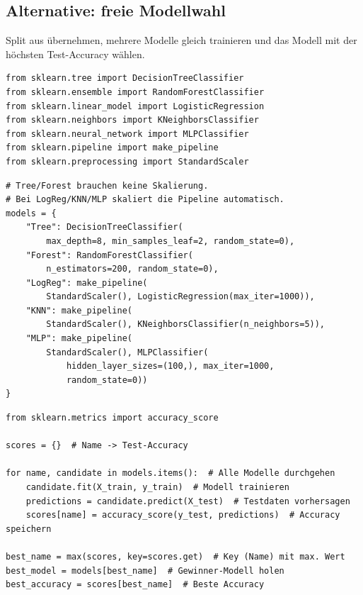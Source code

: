 \subsection{Alternative: freie Modellwahl}\label{sec:09-modellvergleich}
 Split aus  übernehmen, mehrere Modelle gleich trainieren und das Modell mit der höchsten Test-Accuracy wählen.

\begin{codebox}
\begin{lstlisting}[style=CodeExpert]
from sklearn.tree import DecisionTreeClassifier
from sklearn.ensemble import RandomForestClassifier
from sklearn.linear_model import LogisticRegression
from sklearn.neighbors import KNeighborsClassifier
from sklearn.neural_network import MLPClassifier
from sklearn.pipeline import make_pipeline
from sklearn.preprocessing import StandardScaler
\end{lstlisting}
\end{codebox}

\begin{codebox}
\begin{lstlisting}[style=CodeExpert]
# Tree/Forest brauchen keine Skalierung.
# Bei LogReg/KNN/MLP skaliert die Pipeline automatisch.
models = {
    "Tree": DecisionTreeClassifier(
        max_depth=8, min_samples_leaf=2, random_state=0),
    "Forest": RandomForestClassifier(
        n_estimators=200, random_state=0),
    "LogReg": make_pipeline(
        StandardScaler(), LogisticRegression(max_iter=1000)),
    "KNN": make_pipeline(
        StandardScaler(), KNeighborsClassifier(n_neighbors=5)),
    "MLP": make_pipeline(
        StandardScaler(), MLPClassifier(
            hidden_layer_sizes=(100,), max_iter=1000,
            random_state=0))
}
\end{lstlisting}
\end{codebox}

\begin{codebox}
\begin{lstlisting}[style=CodeExpert]
from sklearn.metrics import accuracy_score

scores = {}  # Name -> Test-Accuracy

for name, candidate in models.items():  # Alle Modelle durchgehen
    candidate.fit(X_train, y_train)  # Modell trainieren
    predictions = candidate.predict(X_test)  # Testdaten vorhersagen
    scores[name] = accuracy_score(y_test, predictions)  # Accuracy speichern

best_name = max(scores, key=scores.get)  # Key (Name) mit max. Wert
best_model = models[best_name]  # Gewinner-Modell holen
best_accuracy = scores[best_name]  # Beste Accuracy
\end{lstlisting}
\end{codebox}

